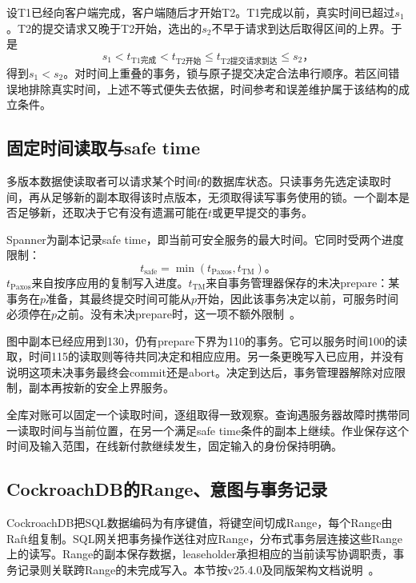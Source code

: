 
设T1已经向客户端完成，客户端随后才开始T2。T1完成以前，真实时间已超过$s_1$。T2的提交请求又晚于T2开始，选出的$s_2$不早于请求到达后取得区间的上界。于是
\[
s_1<t_{\text{T1完成}}<t_{\text{T2开始}}
\le t_{\text{T2提交请求到达}}\le s_2\text{，}
\]
得到$s_1<s_2$。对时间上重叠的事务，锁与原子提交决定合法串行顺序。若区间错误地排除真实时间，上述不等式便失去依据，时间参考和误差维护属于该结构的成立条件。

\subsection{固定时间读取与safe time}

多版本数据使读取者可以请求某个时间$t$的数据库状态。只读事务先选定读取时间，再从足够新的副本取得该时点版本，无须取得读写事务使用的锁。一个副本是否足够新，还取决于它有没有遗漏可能在$t$或更早提交的事务。

Spanner为副本记录safe time，即当前可安全服务的最大时间。它同时受两个进度限制：
\[
t_{\mathrm{safe}}=\min(t_{\mathrm{Paxos}},t_{\mathrm{TM}})\text{。}
\]
$t_{\mathrm{Paxos}}$来自按序应用的复制写入进度。$t_{\mathrm{TM}}$来自事务管理器保存的未决prepare：某事务在$p$准备，其最终提交时间可能从$p$开始，因此该事务决定以前，可服务时间必须停在$p$之前。没有未决prepare时，这一项不额外限制~\cite{spanner2012}。


图中副本已经应用到130，仍有prepare下界为110的事务。它可以服务时间100的读取，时间115的读取则等待共同决定和相应应用。另一条更晚写入已应用，并没有说明这项未决事务最终会commit还是abort。决定到达后，事务管理器解除对应限制，副本再按新的安全上界服务。

全库对账可以固定一个读取时间，逐组取得一致观察。查询遇服务器故障时携带同一读取时间与当前位置，在另一个满足safe time条件的副本上继续。作业保存这个时间及输入范围，在线新付款继续发生，固定输入的身份保持明确。

\subsection{CockroachDB的Range、意图与事务记录}

CockroachDB把SQL数据编码为有序键值，将键空间切成Range，每个Range由Raft组复制。SQL网关把事务操作送往对应Range，分布式事务层连接这些Range上的读写。Range的副本保存数据，leaseholder承担相应的当前读写协调职责，事务记录则关联跨Range的未完成写入。本节按v25.4.0及同版架构文档说明~\cite{crdb254-transactions}。

